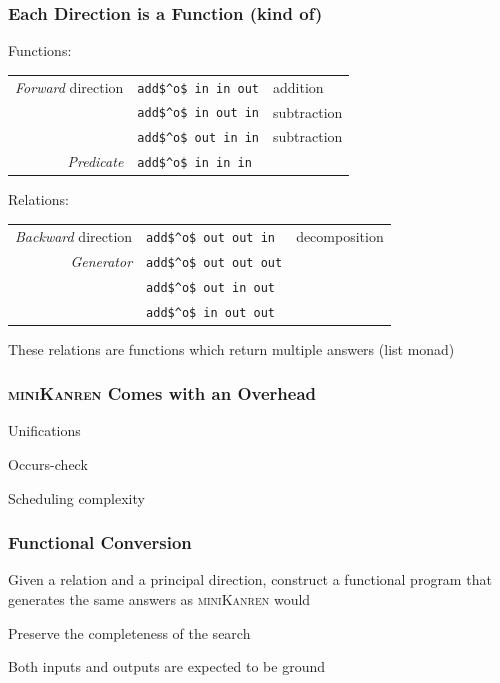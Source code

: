 \documentclass[xcolor=table]{beamer}
\newcommand{\mk}{\textsc{miniKanren}\xspace}
\begin{document}
\begin{frame}[noframenumbering]
  \frametitle{Each Direction is a Function (kind of)}
Functions:
\begin{center}
\begin{tabular}{rll}
  \emph{Forward} direction  & \lstinline|add$^o$ in in out|   & addition      \\
                            & \lstinline|add$^o$ in out in|   & subtraction   \\
                            & \lstinline|add$^o$ out in in|   & subtraction   \\
  \emph{Predicate}          & \lstinline|add$^o$ in in in|    &
\end{tabular}
\end{center}

\vfill

Relations:
\begin{center}
\begin{tabular}{rll}
  \emph{Backward} direction & \lstinline|add$^o$ out out in|  & decomposition \\
  \emph{Generator}          & \lstinline|add$^o$ out out out| &               \\
                            & \lstinline|add$^o$ out in out|  &               \\
                            & \lstinline|add$^o$ in out out|  &
\end{tabular}
\end{center}
These relations are functions which return multiple answers (list monad)
\end{frame}

\begin{frame}[fragile]
  \frametitle{\mk Comes with an Overhead}
  \begin{center}
    Unifications
  \end{center}

  \begin{center}
    Occurs-check
  \end{center}

  \begin{center}
    Scheduling complexity
  \end{center}
\end{frame}

\begin{frame}[fragile]
  \frametitle{Functional Conversion}
\begin{center}
  Given a relation and a principal direction, construct a functional program that generates the same answers as \mk would
\end{center}

\vfill

\begin{center}
  Preserve the completeness of the search
\end{center}

\vfill

\begin{center}
Both inputs and outputs are expected to be ground
\end{center}
\end{frame}
\end{document}
